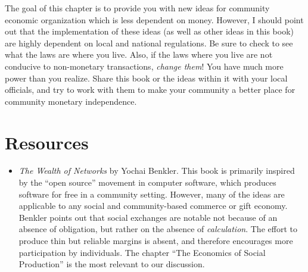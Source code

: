 \begin{infonote}
The goal of this chapter is to provide you with new ideas for community
economic organization which is less dependent on money.  However, I
should point out that the implementation of these ideas (as well as other
ideas in this book) are highly dependent on local and national regulations.
Be sure to check to see what the laws are where you live.  Also, if the
laws where you live are not conducive to non-monetary transactions, 
\textit{change them}!  You have much more power than you realize.  Share
this book or the ideas within it with your local officials, and try to
work with them to make your community a better place for community 
monetary independence.
\end{infonote}

\section{Resources}
\begin{itemize}
\item
\textit{The Wealth of Networks} by Yochai Benkler.  This book is primarily inspired by the ``open source'' movement
in computer software, which produces software for free in a community setting.  However, many of the ideas
are applicable to any social and community-based commerce or gift economy.  Benkler points out that social
exchanges are notable not because of an absence of obligation, but rather on the absence of \textit{calculation}.
The effort to produce thin but reliable margins is absent, and therefore encourages more participation by
individuals.  The chapter ``The Economics of Social Production'' is the most relevant to our discussion.
\end{itemize}
